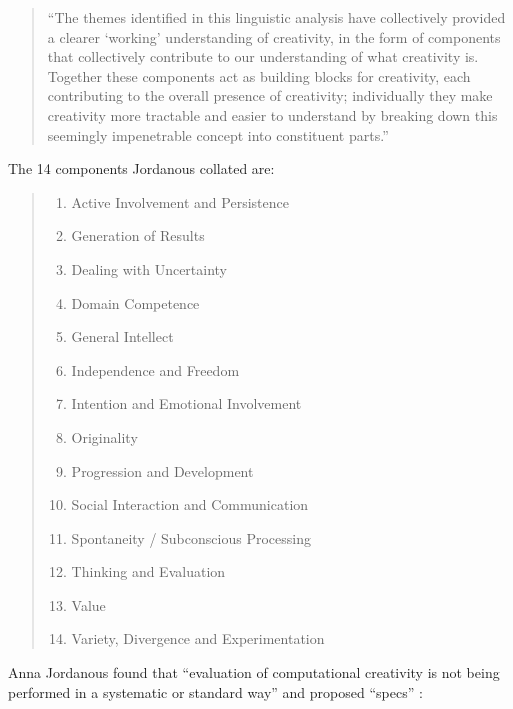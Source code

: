 \begin{quotation}
  ``The themes identified in this linguistic analysis have collectively provided a clearer `working' understanding of creativity, in the form of components that collectively contribute to our understanding of what creativity is. Together these components act as building blocks for creativity, each contributing to the overall presence of creativity; individually they make creativity more tractable and easier to understand by breaking down this seemingly impenetrable concept into constituent parts.'' 
\end{quotation}

The 14 components Jordanous collated are: \citeyear[p.118-120]{Jordanous2012}
\begin{quotation}
  \begin{enumerate}
    \item Active Involvement and Persistence
    \item Generation of Results
    \item Dealing with Uncertainty
    \item Domain Competence
    \item General Intellect
    \item Independence and Freedom
    \item Intention and Emotional Involvement
    \item Originality
    \item Progression and Development
    \item Social Interaction and Communication
    \item Spontaneity / Subconscious Processing
    \item Thinking and Evaluation
    \item Value
    \item Variety, Divergence and Experimentation
  \end{enumerate}
\end{quotation}

Anna Jordanous found that ``evaluation of computational creativity is not being performed in a systematic or standard way'' \autocite[p.2]{Jordanous2011} and proposed ``\gls{specs}'' \autocite[p.137-140]{Jordanous2012a}:
\label{s:specs}

